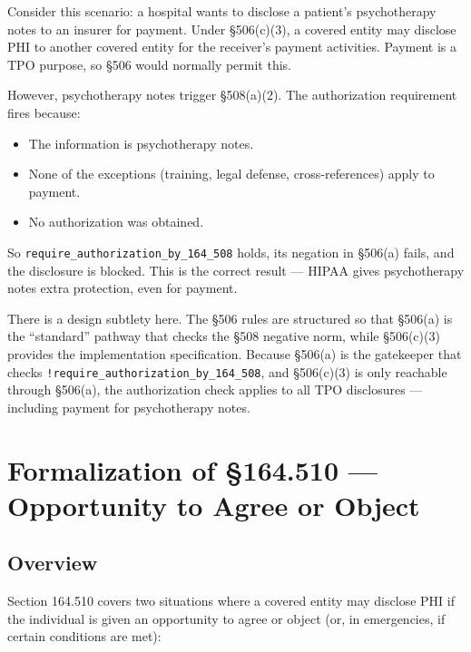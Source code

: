 \documentclass[11pt,letterpaper]{article}
\begin{document}
Consider this scenario: a hospital wants to disclose a patient's psychotherapy notes to an insurer for payment. Under \S 506(c)(3), a covered entity may disclose PHI to another covered entity for the receiver's payment activities. Payment is a TPO purpose, so \S 506 would normally permit this.

However, psychotherapy notes trigger \S 508(a)(2). The authorization requirement fires because:
\begin{itemize}
  \item The information is psychotherapy notes.
  \item None of the exceptions (training, legal defense, cross-references) apply to payment.
  \item No authorization was obtained.
\end{itemize}

So \texttt{require\_authorization\_by\_164\_508} holds, its negation in \S 506(a) fails, and the disclosure is blocked. This is the correct result --- HIPAA gives psychotherapy notes extra protection, even for payment.

\begin{designbox}
There is a design subtlety here. The \S 506 rules are structured so that \S 506(a) is the ``standard'' pathway that checks the \S 508 negative norm, while \S 506(c)(3) provides the implementation specification. Because \S 506(a) is the gatekeeper that checks \texttt{!require\_authorization\_by\_164\_508}, and \S 506(c)(3) is only reachable through \S 506(a), the authorization check applies to all TPO disclosures --- including payment for psychotherapy notes.
\end{designbox}


\section{Formalization of \S 164.510 --- Opportunity to Agree or Object}
\label{sec:510}

\subsection{Overview}

Section 164.510 covers two situations where a covered entity may disclose PHI if the individual is given an opportunity to agree or object (or, in emergencies, if certain conditions are met):
\end{document}
